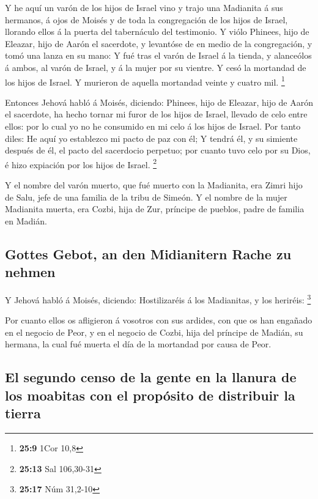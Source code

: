  Y he aquí un varón de los hijos de Israel vino y trajo una
Madianita á sus hermanos, á ojos de Moisés y de toda la congregación de
los hijos de Israel, llorando ellos á la puerta del tabernáculo del
testimonio.  Y viólo Phinees, hijo de Eleazar, hijo de Aarón
el sacerdote, y levantóse de en medio de la congregación, y tomó una
lanza en su mano:  Y fué tras el varón de Israel á la
tienda, y alanceólos á ambos, al varón de Israel, y á la mujer por su
vientre. Y cesó la mortandad de los hijos de Israel.  Y
murieron de aquella mortandad veinte y cuatro mil. \footnote{\textbf{25:9}
  1Cor 10,8}

 Entonces Jehová habló á Moisés, diciendo: 
Phinees, hijo de Eleazar, hijo de Aarón el sacerdote, ha hecho tornar mi
furor de los hijos de Israel, llevado de celo entre ellos: por lo cual
yo no he consumido en mi celo á los hijos de Israel.  Por
tanto diles: He aquí yo establezco mi pacto de paz con él; 
Y tendrá él, y su simiente después de él, el pacto del sacerdocio
perpetuo; por cuanto tuvo celo por su Dios, é hizo expiación por los
hijos de Israel. \footnote{\textbf{25:13} Sal 106,30-31}

 Y el nombre del varón muerto, que fué muerto con la
Madianita, era Zimri hijo de Salu, jefe de una familia de la tribu de
Simeón.  Y el nombre de la mujer Madianita muerta, era
Cozbi, hija de Zur, príncipe de pueblos, padre de familia en Madián.

\hypertarget{gottes-gebot-an-den-midianitern-rache-zu-nehmen}{%
\subsection{Gottes Gebot, an den Midianitern Rache zu
nehmen}\label{gottes-gebot-an-den-midianitern-rache-zu-nehmen}}

 Y Jehová habló á Moisés, diciendo: 
Hostilizaréis á los Madianitas, y los heriréis: \footnote{\textbf{25:17}
  Núm 31,2-10}

 Por cuanto ellos os afligieron á vosotros con sus ardides,
con que os han engañado en el negocio de Peor, y en el negocio de Cozbi,
hija del príncipe de Madián, su hermana, la cual fué muerta el día de la
mortandad por causa de Peor.

\hypertarget{el-segundo-censo-de-la-gente-en-la-llanura-de-los-moabitas-con-el-propuxf3sito-de-distribuir-la-tierra}{%
\subsection{El segundo censo de la gente en la llanura de los moabitas
con el propósito de distribuir la
tierra}\label{el-segundo-censo-de-la-gente-en-la-llanura-de-los-moabitas-con-el-propuxf3sito-de-distribuir-la-tierra}}

